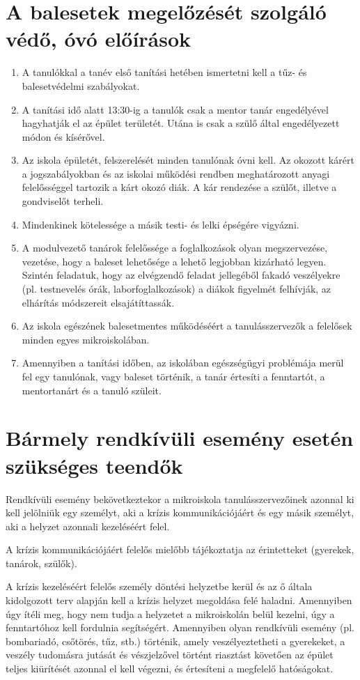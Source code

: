 \section{A balesetek megelőzését szolgáló védő, óvó előírások}
\begin{enumerate}

\item A tanulókkal a tanév első tanítási hetében ismertetni kell a tűz- és balesetvédelmi
szabályokat.
\item A tanítási idő alatt 13:30-ig a tanulók csak a mentor tanár engedélyével hagyhatják el
az épület területét. Utána is csak a szülő által engedélyezett módon és kísérővel. 
\item Az iskola épületét, felszerelését minden tanulónak óvni kell. Az okozott kárért a jogszabályokban és az iskolai működési rendben meghatározott anyagi felelősséggel
tartozik a kárt okozó diák. A kár rendezése a szülőt, illetve a gondviselőt terheli.
\item Mindenkinek kötelessége a másik testi- és lelki épségére vigyázni.
\item A modulvezető tanárok felelőssége a foglalkozások olyan megszervezése, vezetése, hogy a
baleset lehetősége a lehető legjobban kizárható legyen. Szintén feladatuk, hogy az
elvégzendő feladat jellegéből fakadó veszélyekre (pl. testnevelés órák, laborfoglalkozások) a diákok figyelmét felhívják, az elhárítás módszereit elsajátíttassák.
\item Az iskola egészének balesetmentes működéséért a tanulásszervezők a felelősek minden egyes mikroiskolában.
\item Amennyiben a tanítási időben, az iskolában egészségügyi problémája merül fel egy
tanulónak, vagy baleset történik, a tanár értesíti a fenntartót, a mentortanárt és a tanuló szüleit.

\end{enumerate}
\section{Bármely rendkívüli esemény esetén szükséges teendők}
Rendkívüli esemény bekövetkeztekor a mikroiskola tanulásszervezőinek azonnal ki kell jelölniük egy személyt, aki a krízis kommunikációjáért és egy másik személyt, aki a helyzet azonnali kezeléséért felel.

A krízis kommunikációjáért felelős mielőbb tájékoztatja  az érintetteket (gyerekek, tanárok, szülők).

A krízis kezeléséért felelős személy döntési helyzetbe kerül és az ő általa kidolgozott terv alapján kell a krízis helyzet megoldása felé haladni. Amennyiben úgy ítéli meg, hogy nem tudja a helyzetet a mikroiskolán belül kezelni, úgy a fenntartóhoz kell fordulnia segítségért. 
Amennyiben olyan rendkívüli esemény (pl. bombariadó, csőtörés, tűz, stb.) történik, amely veszélyeztetheti a gyerekeket, a veszély tudomásra jutását és vészjelzővel történt riasztást követően az épület teljes kiürítését azonnal el kell végezni, és értesíteni a megfelelő hatóságokat. 

